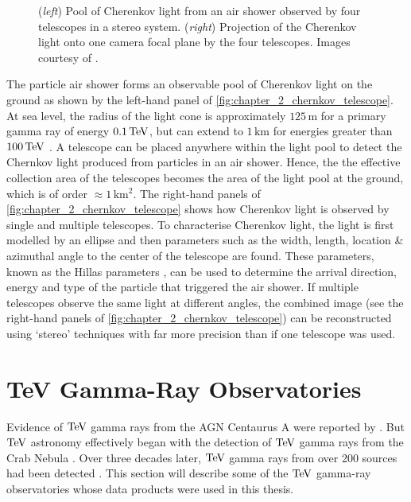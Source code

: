 \begin{figure}[h]
    \caption{(\textit{left}) Pool of Cherenkov light from an air shower observed by four telescopes in a stereo system.
    (\textit{right}) Projection of the Cherenkov light onto one camera focal plane by the four telescopes. Images courtesy of \cite{2009ExA....25..173V,}.}
    \label{fig:chapter_2_chernkov_telescope}
\end{figure}
\newpar
The particle air shower forms an observable pool of Cherenkov light on the ground as shown by the left-hand panel of \autoref{fig:chapter_2_chernkov_telescope}. At sea level, the radius of the light cone is approximately $125\,\si{\meter}$ for a primary gamma ray of energy $0.1\,\TeV$, but can extend to $1\,\si{\kilo\meter}$ for energies greater than $100\,\TeV$ \citep{Patterson_1983}.  A telescope can be placed anywhere within the light pool to detect the Chernkov light produced from particles in an air shower. Hence, the the effective collection area of the telescopes becomes the area of the light pool at the ground, which is of order $\approx1\,\si{\kilo\meter\squared}$.
\newpar
The right-hand panels of \autoref{fig:chapter_2_chernkov_telescope} shows how Cherenkov light is observed by single and multiple telescopes. To characterise Cherenkov light, the light is first modelled by an ellipse and then parameters such as the width, length, location \& azimuthal angle to the center of the telescope are found. These parameters, known as the Hillas parameters \citep{1985ICRC....3..445H}, can be used to determine the arrival direction, energy and type of the particle that triggered the air shower. If multiple telescopes observe the same light at different angles, the combined image (see the right-hand panels of \autoref{fig:chapter_2_chernkov_telescope}) can be reconstructed using `stereo' techniques with far more precision than if one telescope was used.

\section{TeV Gamma-Ray Observatories} \label{sec:02_TeV_observatories}

Evidence of $\TeV$ gamma rays from the AGN Centaurus A were reported by \cite{1975ApJ...197L...9G}. But $\TeV$ astronomy effectively began with the detection of $\TeV$ gamma rays from the Crab Nebula \citep{1989ApJ...342..379W}. Over three decades later, $\TeV$ gamma rays from over 200 sources had been detected \citep{2008ICRC....3.1341W}. This section will describe some of the $\TeV$ gamma-ray observatories whose data products were used in this thesis.

